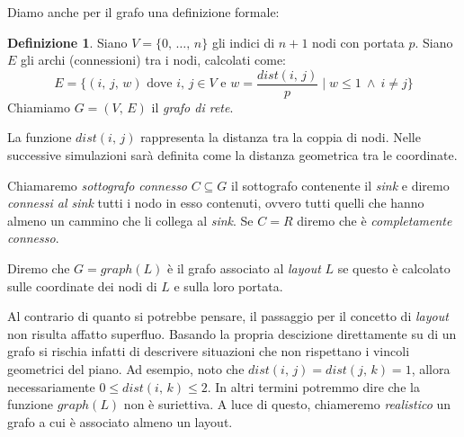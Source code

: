 \documentclass[a4paper,12pt]{article}
\theoremstyle{definition}
\newtheorem{definition}{Definizione}
\begin{document}
Diamo anche per il grafo una definizione formale:

\begin{definition}
Siano $V = \{0,\,\dots,\,n\}$ gli indici di $n+1$ nodi con portata $p$. Siano $E$ gli archi (connessioni) tra i nodi, calcolati come:
\begin{equation*}
E = \{ (i,\,j,\,w) \text{ dove } i,\,j \in V \text{ e } w = \frac{dist(i,\,j)}{p} \mid w \le 1 \ \wedge \ i \neq j\}
\end{equation*}
Chiamiamo $G = (V,\,E)$ il \emph{grafo di rete}.
\end{definition}


La funzione $dist(i,\,j)$ rappresenta la distanza tra la coppia di nodi. Nelle successive simulazioni sarà definita come la distanza geometrica tra le coordinate.


Chiamaremo \emph{sottografo connesso} $C \subseteq G$ il sottografo contenente il \emph{sink} e diremo \emph{connessi al sink} tutti i nodo in esso contenuti, ovvero tutti quelli che hanno almeno un cammino che li collega al \emph{sink}. Se $C = R$ diremo che è \emph{completamente connesso}.

Diremo che $G = graph(L)$ è il grafo associato al \emph{layout} $L$ se questo è calcolato sulle coordinate dei nodi di $L$ e sulla loro portata.

Al contrario di quanto si potrebbe pensare, il passaggio per il concetto di \emph{layout} non risulta affatto superfluo. Basando la propria descizione direttamente su di un grafo si rischia infatti di descrivere situazioni che non rispettano i vincoli geometrici del piano. Ad esempio, noto che $dist(i,\,j) = dist(j,\,k) = 1$, allora necessariamente $0 \leq dist(i,\,k) \leq 2$. In altri termini potremmo dire che la funzione $graph(L)$ non è suriettiva. A luce di questo, chiameremo \emph{realistico} un grafo a cui è associato almeno un layout.
\end{document}
